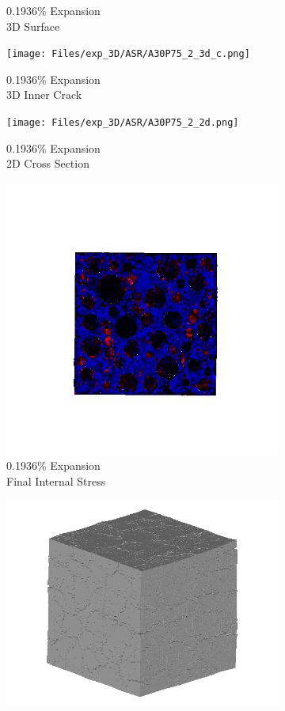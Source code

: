 \begin{figure}[ht!]
\begin{subfigure}{.25\textwidth}
      \caption{0.1936\% Expansion\\3D Surface}
    \end{subfigure}%
    \begin{subfigure}{.25\textwidth}
      \centering
      \texttt{[image: Files/exp\_3D/ASR/A30P75\_2\_3d\_c.png]}
      \caption{0.1936\% Expansion\\3D Inner Crack}
    \end{subfigure}%
    \begin{subfigure}{.25\textwidth}
      \centering
      \texttt{[image: Files/exp\_3D/ASR/A30P75\_2\_2d.png]}
      \caption{0.1936\% Expansion\\2D Cross Section}
    \end{subfigure}%
    \begin{subfigure}{.25\textwidth}
      \centering
      \includegraphics[width=.8\linewidth]{Files/exp_3D/ASR/A30P75_2_stress.png}
      \caption{0.1936\% Expansion\\Final Internal Stress}
    \end{subfigure}
    \begin{subfigure}{.25\textwidth}
      \centering
      \includegraphics[width=.8\linewidth]{Files/exp_3D/ASR/A30P75_3_3d.png}

\end{subfigure}
\end{figure}
